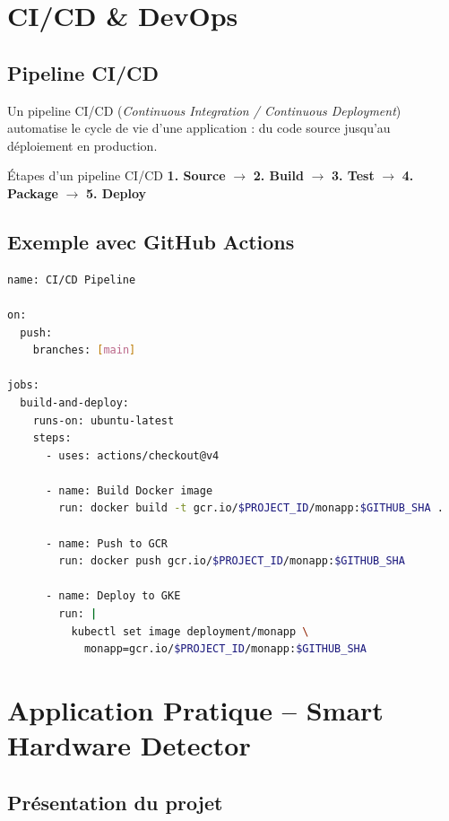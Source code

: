 \documentclass[12pt,a4paper]{article}
\begin{document}
\section{CI/CD \& DevOps}

\subsection{Pipeline CI/CD}

Un pipeline CI/CD (\textit{Continuous Integration / Continuous Deployment}) automatise le cycle de vie d'une application : du code source jusqu'au déploiement en production.

\begin{keybox}{Étapes d'un pipeline CI/CD}
\textbf{1. Source} $\rightarrow$ \textbf{2. Build} $\rightarrow$ \textbf{3. Test} $\rightarrow$ \textbf{4. Package} $\rightarrow$ \textbf{5. Deploy}
\end{keybox}

\subsection{Exemple avec GitHub Actions}

\begin{lstlisting}[language=bash, caption=Pipeline GitHub Actions -- CI/CD vers GKE]
name: CI/CD Pipeline

on:
  push:
    branches: [main]

jobs:
  build-and-deploy:
    runs-on: ubuntu-latest
    steps:
      - uses: actions/checkout@v4

      - name: Build Docker image
        run: docker build -t gcr.io/$PROJECT_ID/monapp:$GITHUB_SHA .

      - name: Push to GCR
        run: docker push gcr.io/$PROJECT_ID/monapp:$GITHUB_SHA

      - name: Deploy to GKE
        run: |
          kubectl set image deployment/monapp \
            monapp=gcr.io/$PROJECT_ID/monapp:$GITHUB_SHA
\end{lstlisting}

\section{Application Pratique -- Smart Hardware Detector}

\subsection{Présentation du projet}
\end{document}
